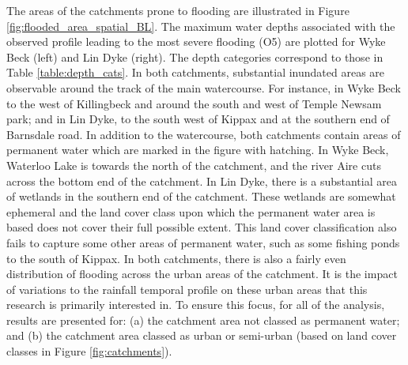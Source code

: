 \documentclass[APA,Times2COL]{WileyNJDv5}
\begin{document}
The areas of the catchments prone to flooding are illustrated in Figure \ref{fig:flooded_area_spatial_BL}. The maximum water depths associated with the observed profile leading to the most severe flooding (O5) are plotted for Wyke Beck (left) and Lin Dyke (right). The depth categories correspond to those in Table \ref{table:depth_cats}. In both catchments, substantial inundated areas are observable around the track of the main watercourse. For instance, in Wyke Beck to the west of Killingbeck and around the south and west of Temple Newsam park; and in Lin Dyke, to the south west of Kippax and at the southern end of Barnsdale road. In addition to the watercourse, both catchments contain areas of permanent water which are marked in the figure with hatching. In Wyke Beck, Waterloo Lake is towards the north of the catchment, and the river Aire cuts across the bottom end of the catchment. In Lin Dyke, there is a substantial area of wetlands in the southern end of the catchment. These wetlands are somewhat ephemeral and the land cover class upon which the permanent water area is based does not cover their full possible extent. This land cover classification also fails to capture some other areas of permanent water, such as some fishing ponds to the south of Kippax. In both catchments, there is also a fairly even distribution of flooding across the urban areas of the catchment. It is the impact of variations to the rainfall temporal profile on these urban areas that this research is primarily interested in. To ensure this focus, for all of the analysis, results are presented for: (a) the catchment area not classed as permanent water; and (b) the catchment area classed as urban or semi-urban (based on land cover classes in Figure \ref{fig:catchments}).


\end{document}
